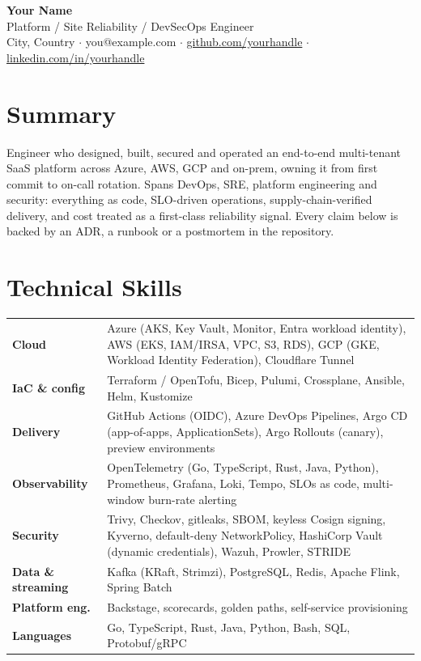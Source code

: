 \documentclass[10pt,letterpaper]{article}
\begin{document}
\begin{center}
  {\Huge\bfseries Your Name}\\[4pt]
  Platform / Site Reliability / DevSecOps Engineer\\[3pt]
  {\small City, Country \;$\cdot$\; you@example.com \;$\cdot$\;
  \href{https://github.com/yourhandle}{github.com/yourhandle} \;$\cdot$\;
  \href{https://linkedin.com/in/yourhandle}{linkedin.com/in/yourhandle}}
\end{center}

\section{Summary}
Engineer who designed, built, secured and operated an end-to-end multi-tenant SaaS
platform across Azure, AWS, GCP and on-prem, owning it from first commit to on-call
rotation. Spans DevOps, SRE, platform engineering and security: everything as code,
SLO-driven operations, supply-chain-verified delivery, and cost treated as a
first-class reliability signal. Every claim below is backed by an ADR, a runbook or a
postmortem in the repository.

\section{Technical Skills}
\begin{tabularx}{\linewidth}{@{}l X@{}}
\textbf{Cloud} & Azure (AKS, Key Vault, Monitor, Entra workload identity), AWS (EKS, IAM/IRSA, VPC, S3, RDS), GCP (GKE, Workload Identity Federation), Cloudflare Tunnel \\
\textbf{IaC \& config} & Terraform / OpenTofu, Bicep, Pulumi, Crossplane, Ansible, Helm, Kustomize \\
\textbf{Delivery} & GitHub Actions (OIDC), Azure DevOps Pipelines, Argo CD (app-of-apps, ApplicationSets), Argo Rollouts (canary), preview environments \\
\textbf{Observability} & OpenTelemetry (Go, TypeScript, Rust, Java, Python), Prometheus, Grafana, Loki, Tempo, SLOs as code, multi-window burn-rate alerting \\
\textbf{Security} & Trivy, Checkov, gitleaks, SBOM, keyless Cosign signing, Kyverno, default-deny NetworkPolicy, HashiCorp Vault (dynamic credentials), Wazuh, Prowler, STRIDE \\
\textbf{Data \& streaming} & Kafka (KRaft, Strimzi), PostgreSQL, Redis, Apache Flink, Spring Batch \\
\textbf{Platform eng.} & Backstage, scorecards, golden paths, self-service provisioning \\
\textbf{Languages} & Go, TypeScript, Rust, Java, Python, Bash, SQL, Protobuf/gRPC \\
\end{tabularx}
\end{document}
